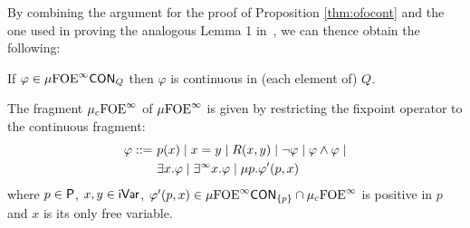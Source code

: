 By combining the argument for the proof of Proposition \ref{thm:ofocont} and
the one used in proving the analogous Lemma 1 in~\cite{Fontaine08}, we can thence obtain the following:
\begin{proposition}\label{lem:cofoeiscont_mu}
If $\varphi \in \mu{\ensuremath{\mathrm{FOE}}}^\infty\mathsf{CON}_{Q}$ then $\varphi$ is continuous in (each element of) $Q$.
\end{proposition}

\begin{definition}
The fragment $\mu_{c}{\mathrm{FOE}}^\infty$ of $\mu{\ensuremath{\mathrm{FOE}}}^\infty$ is given by restricting the fixpoint operator to the continuous fragment:
\begin{align*}
\varphi ::=\ & p(x) \mid x=y \mid R(x,y) \mid \lnot\varphi \mid \varphi \land \varphi \mid\\
& \exists x.\varphi \mid \exists^\infty x.\varphi \mid \mu p.\varphi'(p,x)
\end{align*}
%
where $p\in\mathsf{P}$, $x,y\in\mathsf{iVar}$, $\varphi'(p,x) \in \mu{\ensuremath{\mathrm{FOE}}}^\infty\mathsf{CON}_{\{p\}} \cap \mu_{c}{\mathrm{FOE}}^\infty$ is positive in $p$ and $x$ is its only free variable.%
\end{definition}


